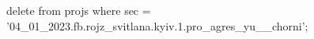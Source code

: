  
 
 
 
 

delete from projs where sec = '04_01_2023.fb.rojz_svitlana.kyiv.1.pro_agres_yu__chorni';
